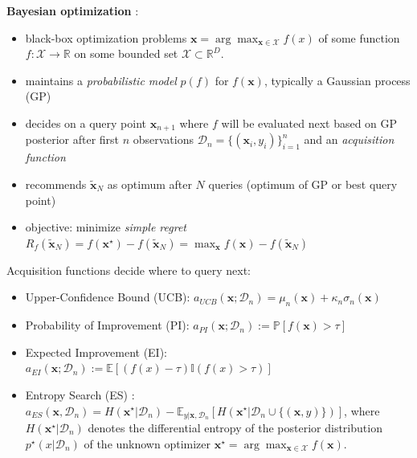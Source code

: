 \begin{block}{}
\textbf{Bayesian optimization} \cite{shahriari_taking_2016}:
\begin{itemize}
\item black-box optimization problems $\mathbf{x} = \arg\max_{\mathbf{x} \in \mathcal{X}} f(x)$ of some function $f: \mathcal{X} \to \mathbb{R}$ on some bounded set $\mathcal{X} \subset \mathbb{R}^D$.
\item maintains a \emph{probabilistic model} $p(f)$ for $f(\mathbf{x})$, typically a Gaussian process (GP)
\item decides on a query point $\mathbf{x}_{n+1}$ where $f$ will be evaluated next based on GP posterior after first $n$ observations $\mathcal{D}_n=\{(\mathbf{x}_i, y_i)\}_{i=1}^n$ and an \emph{acquisition function}
\item recommends $\mathbf{\tilde x}_N$ as optimum after $N$ queries (optimum of GP or best query point)
\item objective: minimize \emph{simple regret} 
$R_f(\mathbf{\tilde  x}_N) = f(\mathbf{x}^\star) - f(\mathbf{\tilde  x}_N) = \max_{\mathbf{x}} f(\mathbf{x}) - f(\mathbf{\tilde x}_N)$
\end{itemize}

Acquisition functions decide where to query next:
\begin{itemize}
\item Upper-Confidence Bound (UCB): $a_{UCB}(\mathbf{x};
\mathcal{D}_n) = \mu_{n}(\mathbf{x}) + \kappa_n \sigma_{n}(\mathbf{x})$
\item Probability of Improvement (PI): $a_{PI}(\mathbf{x}; \mathcal{D}_n) := \mathbb{P}[f(\mathbf{x}) > \tau]$
\item Expected Improvement (EI): $a_{EI}(\mathbf{x}; \mathcal{D}_n) := \mathbb{E}[(f(x) - \tau)\mathbb{I}(f(x) > \tau)]$
\item Entropy Search (ES) \cite{hennig_entropy_2012}: $a_{ES}(\mathbf{x}, \mathcal{D}_n)
  = H(\mathbf{x}^\star \vert \mathcal{D}_n) - \mathbb{E}_{y \vert \mathbf{x}, \mathcal{D}_n}
	[H(\mathbf{x}^\star \vert \mathcal{D}_n \cup \{(\mathbf{x}, y)\})]$,
	where $H(\mathbf{x}^\star \vert \mathcal{D}_n)$ denotes the differential entropy
of the posterior distribution $p^\star(x \vert \mathcal{D}_n)$ of the unknown optimizer $\mathbf{x}^\star = \arg\max_{\mathbf{x} \in \mathcal{X}} f(\mathbf{x})$.
\end{itemize}

\end{block}

